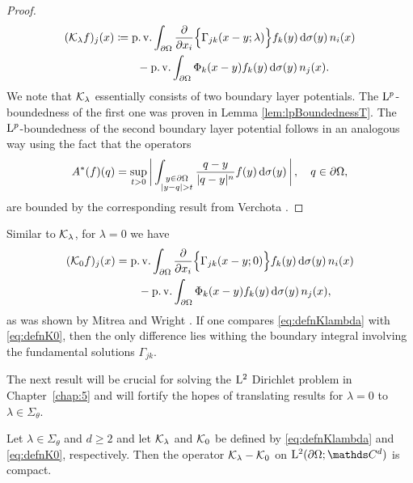 \begin{proof}
\begin{align}
\begin{alignedat}{1}
    (\mathcal{K}_\lambda f)_j (x)
      &\coloneqq \operatorname{p. v.} \int_{\partial\Omega} \frac{\partial}{\partial x_i} \Big\{\Gamma_{jk}(x - y; \lambda) \Big\}  f_k(y) \, {\operatorname{d}\!{\sigma}}(y) \, n_i(x) \\
      &\qquad - \operatorname{p. v.} \int_{\partial\Omega} \Phi_k(x - y) f_k(y) \, {\operatorname{d}\!{\sigma}}(y)\, n_j(x).
    \end{alignedat}
  \end{align}
  We note that $\mathcal{K}_\lambda$ essentially consists of two boundary layer potentials. 
  The $\mathrm{L}^p$-boundedness of the first one was proven in Lemma \ref{lem:lpBoundednessT}.
  The $\mathrm{L}^p$-boundedness of the second boundary layer potential follows in an analogous way using the fact that the operators
  \begin{align*}
    A^*(f)(q) = \sup_{t > 0} \bigg| \int_{\substack{y \in \partial\Omega \\ |y - q| > t}} \frac{q - y}{|q - y|^n} f(y) \, {\operatorname{d}\!{\sigma}}(y)\, \bigg|\, , \quad q \in \partial\Omega,
  \end{align*}
  are bounded by the corresponding result from Verchota \cite[Lem. 1.2]{verchota}.
\end{proof}

Similar to $\mathcal{K}_\lambda$, for $\lambda = 0$ we have
\begin{align}
  \begin{alignedat}{1}
  \label{eq:defnK0}
    (\mathcal{K}_0 f)_j(x)&= \operatorname{p. v.} \int_{\partial\Omega} \frac{\partial}{\partial x_i} \Big\{ \Gamma_{jk}(x - y; 0) \Big\}  f_k(y) \, {\operatorname{d}\!{\sigma}}(y) \,n_i(x) \\
    &\qquad - \operatorname{p. v.} \int_{\partial\Omega} \Phi_k(x - y) f_k(y) \, {\operatorname{d}\!{\sigma}}(y)\, n_j(x),
  \end{alignedat}
\end{align}
as was shown by Mitrea and Wright \cite[Prop. 4.4]{mitreaWright}.
If one compares \eqref{eq:defnKlambda} with \eqref{eq:defnK0}, then the only difference lies withing the boundary integral involving the fundamental solutions $\Gamma_{jk}$.

The next result will be crucial for solving the $\mathrm{L}^2$ Dirichlet problem in Chapter~\ref{chap:5} and will fortify the hopes of translating results for $\lambda = 0$ to $\lambda \in \Sigma_\theta$.
\begin{lem}
  \label{lem:compactness}
  Let $\lambda \in \Sigma_\theta$ and $d \geq 2$ and let $\mathcal{K}_\lambda$ and $\mathcal{K}_0$ be defined by \eqref{eq:defnKlambda} and \eqref{eq:defnK0}, respectively.
  Then the operator $\mathcal{K}_\lambda - \mathcal{K}_0$ on $\Ell^2(\partial\Omega; \C^d)$ is compact.
\end{lem}

